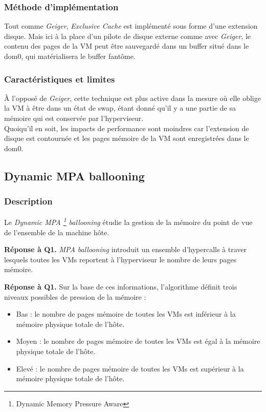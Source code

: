 \subsubsection{Méthode d'implémentation}
Tout comme \textit{Geiger}, \textit{Exclusive Cache} est implémenté sous forme d'une extension disque. Mais ici à la place d'un pilote de disque externe comme avec \textit{Geiger}, le contenu des pages de la VM peut être sauvegardé dans un buffer situé dans le dom0, qui matérialisera le buffer fantôme.

\subsubsection{Caractéristiques et limites}
À l'opposé de \textit{Geiger}, cette technique est plus active dans la mesure où elle oblige la VM à être dans un état de swap, étant donné qu'il y a une partie de sa mémoire qui est conservée par l'hyperviseur.\\
Quoiqu'il en soit, les impacts de performance sont moindres car l'extension de disque est contournée et les pages mémoire de la VM sont enregistrées dans le dom0.

\subsection{Dynamic MPA ballooning}

\subsubsection{Description}
Le \textit{Dynamic MPA \footnote{Dynamic Memory Pressure Aware} ballooning} \cite{dmpa} étudie la gestion de la mémoire du point de vue de l'ensemble de la machine hôte.

\par{\textbf{Réponse à Q1.}} \textit{MPA ballooning} introduit un ensemble d'hypercalls à traver lesquels toutes les VMs reportent à l'hyperviseur le nombre de leurs pages mémoire. 
\par{\textbf{Réponse à Q1.}} Sur la base de ces informations, l'algorithme définit trois niveaux possibles de pression de la mémoire : 
\begin{itemize}
    \item Bas : le nombre de pages mémoire de toutes les VMs est inférieur à la mémoire physique totale de l'hôte.
    \item Moyen : le nombre de pages mémoire de toutes les VMs est égal à la mémoire physique totale de l'hôte.
    \item Elevé : le nombre de pages mémoire de toutes les VMs est supérieur à la mémoire physique totale de l'hôte.
\end{itemize}

